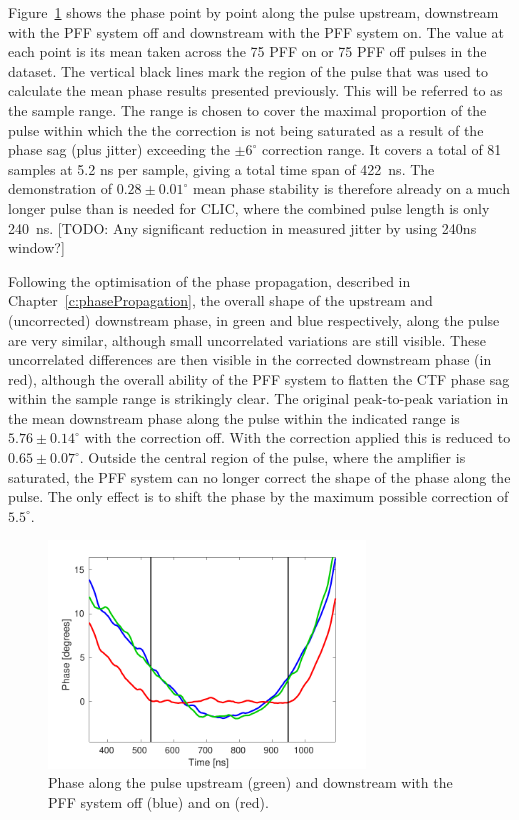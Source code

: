 Figure~\ref{f:BestFF_MeanPhaseAlong} shows the phase point by point along the pulse upstream, downstream with the PFF system off and downstream with the PFF system on. The value at each point is its mean taken across the 75 PFF on or 75 PFF off pulses in the dataset. The vertical black lines mark the region of the pulse that was used to calculate the mean phase results presented previously. This will be referred to as the sample range. The range is chosen to cover the maximal proportion of the pulse within which the the correction is not being saturated as a result of the phase sag (plus jitter) exceeding the \(\pm6^\circ\) correction range. It covers a total of 81 samples at 5.2 ns per sample, giving a total time span of 422~ns. The demonstration of \(0.28\pm0.01^\circ\) mean phase stability is therefore already on a much longer pulse than is needed for CLIC, where the combined pulse length is only 240~ns. [TODO: Any significant reduction in measured jitter by using 240ns window?]

Following the optimisation of the phase propagation, described in Chapter~\ref{c:phasePropagation}, the overall shape of the upstream and (uncorrected) downstream phase, in green and blue respectively, along the pulse are very similar, although small uncorrelated variations are still visible. These uncorrelated differences are then visible in the corrected downstream phase (in red), although the overall ability of the PFF system to flatten the CTF phase sag within the sample range is strikingly clear. The original peak-to-peak variation in the mean downstream phase along the pulse within the indicated range is \(5.76\pm0.14^\circ\) with the correction off. With the correction applied this is reduced to \(0.65\pm0.07^\circ\). Outside the central region of the pulse, where the amplifier is saturated, the PFF system can no longer correct the shape of the phase along the pulse. The only effect is to shift the phase by the maximum possible correction of \(5.5^\circ\).

\begin{figure}
  \centering
  \includegraphics[width=0.75\textwidth]{Figures/feedforward/BestFF_MeanPhaseAlong}
  \caption{Phase along the pulse upstream (green) and downstream with the PFF system off (blue) and on (red).}
  \label{f:BestFF_MeanPhaseAlong}
\end{figure}

